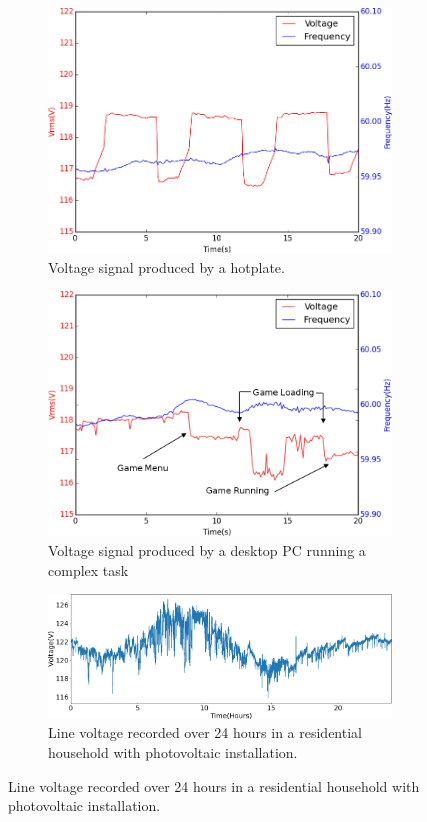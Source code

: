 \begin{figure}[h]
    \centering
    \begin{subfigure}{.5\textwidth}
        \centering
        \includegraphics[width=0.9\linewidth]{img/hotplate.png}
        \caption{Voltage signal produced by a hotplate.}
        \label{intro:fig1:sub1}
    \end{subfigure}%
    \begin{subfigure}{.5\textwidth}
        \centering
        \includegraphics[width=0.9\linewidth]{img/PC.png}
        \caption{Voltage signal produced by a desktop PC running a complex task}
        \label{intro:fig1:sub2}
    \end{subfigure}

    \begin{subfigure}{1\textwidth}
        \centering
        \includegraphics[width=0.9\linewidth]{img/johnson_daily.png}
        \caption{Line voltage recorded over 24 hours in a residential household with photovoltaic installation.}
        \label{intro:fig1:sub3}
    \end{subfigure}


\end{figure}

